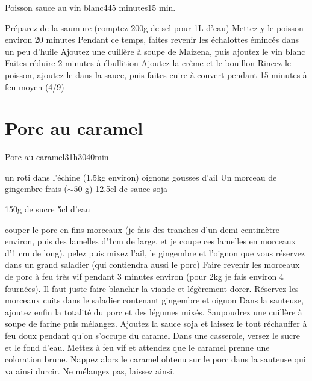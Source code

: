 {\begin{recette}{Poisson sauce au vin blanc}{4}{45 minutes}{15 min.}
\begin{preparation}
\etape Préparez de la saumure (comptez 200g de sel pour 1L d'eau)
\etape Mettez-y le poisson environ 20 minutes
\etape Pendant ce temps, faites revenir les échalottes émincés dans un peu d'huile
\etape Ajoutez une cuillère à soupe de Maizena, puis ajoutez le vin blanc
\etape Faites réduire 2 minutes à ébullition
\etape Ajoutez la crème et le bouillon
\etape Rincez le poisson, ajoutez le dans la sauce, puis faites cuire à couvert pendant 15 minutes à feu moyen (4/9)
\end{preparation}
\end{recette}

\section{Porc au caramel}
\begin{recette}{Porc au caramel}{3}{1h30}{40min}
\begin{ingredients}
\ingredient un roti dans l'échine (1.5kg environ)
 oignons
 gousses d'ail
\ingredient Un morceau de gingembre frais ($\sim 50$ g)
\ingredient 12.5cl de sauce soja

\ingredient 150g de sucre
\ingredient 5cl d'eau
\end{ingredients}

\begin{preparation}
\etape couper le porc en fins morceaux (je fais des tranches d'un demi centimètre environ, puis des lamelles d'1cm de large, et
je coupe ces lamelles en morceaux d'1 cm de long).
\etape pelez puis mixez l'ail, le gingembre et l'oignon que vous réservez dans un grand saladier (qui contiendra aussi le porc)
\etape Faire revenir les morceaux de porc à feu très vif pendant 3 minutes environ (pour 2kg je fais environ 4 fournées). Il
faut juste faire blanchir la viande et légèrement dorer. Réservez les morceaux cuits dans le saladier contenant gingembre et
oignon
\etape Dans la sauteuse, ajoutez enfin la totalité du porc et des légumes mixés. 
\etape Saupoudrez une cuillère à soupe de farine puis mélangez. 
\etape Ajoutez la sauce soja et laissez le tout réchauffer à feu doux pendant qu'on s'occupe du caramel
\etape Dans une casserole, versez le sucre et le fond d'eau. Mettez à feu vif et attendez que le caramel prenne une coloration
brune.
\etape Nappez alors le caramel obtenu sur le porc dans la sauteuse qui va ainsi durcir. Ne mélangez pas, laissez ainsi.
\end{preparation}


\end{recette}}
